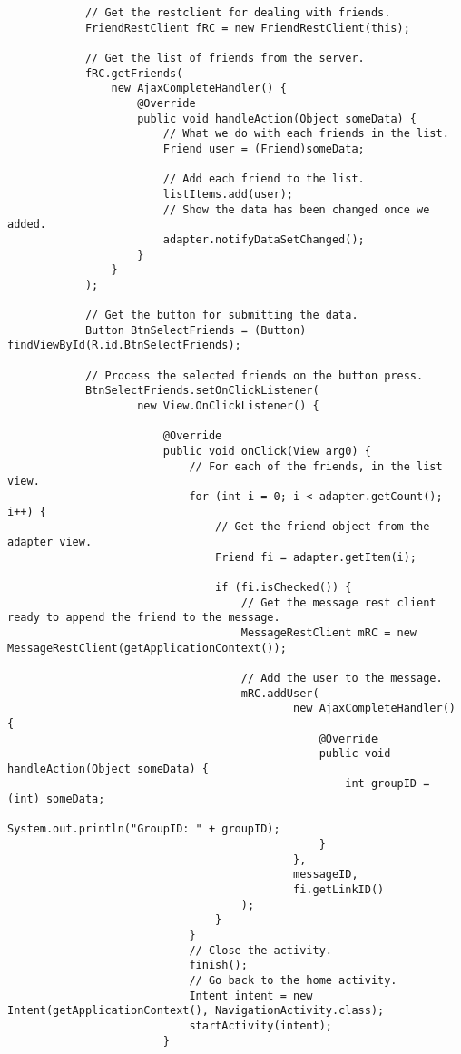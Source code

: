 \begin{lstlisting}
            // Get the restclient for dealing with friends.
            FriendRestClient fRC = new FriendRestClient(this);

            // Get the list of friends from the server.
            fRC.getFriends(
                new AjaxCompleteHandler() {
                    @Override
                    public void handleAction(Object someData) {
                        // What we do with each friends in the list.
                        Friend user = (Friend)someData;

                        // Add each friend to the list.
                        listItems.add(user);
                        // Show the data has been changed once we added.
                        adapter.notifyDataSetChanged();
                    }
                }
            );

            // Get the button for submitting the data.
            Button BtnSelectFriends = (Button) findViewById(R.id.BtnSelectFriends);

            // Process the selected friends on the button press.
            BtnSelectFriends.setOnClickListener(
                    new View.OnClickListener() {

                        @Override
                        public void onClick(View arg0) {
                            // For each of the friends, in the list view.
                            for (int i = 0; i < adapter.getCount(); i++) {
                                // Get the friend object from the adapter view.
                                Friend fi = adapter.getItem(i);

                                if (fi.isChecked()) {
                                    // Get the message rest client ready to append the friend to the message.
                                    MessageRestClient mRC = new MessageRestClient(getApplicationContext());

                                    // Add the user to the message.
                                    mRC.addUser(
                                            new AjaxCompleteHandler() {
                                                @Override
                                                public void handleAction(Object someData) {
                                                    int groupID = (int) someData;
                                                    System.out.println("GroupID: " + groupID);
                                                }
                                            },
                                            messageID,
                                            fi.getLinkID()
                                    );
                                }
                            }
                            // Close the activity.
                            finish();
                            // Go back to the home activity.
                            Intent intent = new Intent(getApplicationContext(), NavigationActivity.class);
                            startActivity(intent);
                        }


\end{lstlisting}
